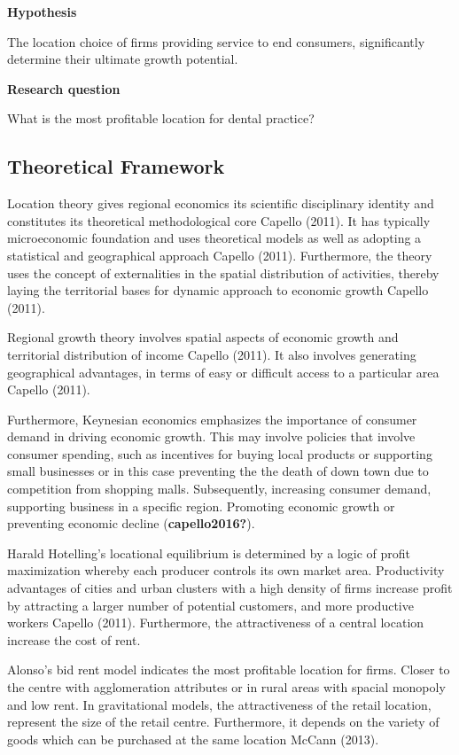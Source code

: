 \documentclass[
  10,
  a4paper,
]{article}
\begin{document}
\textbf{Hypothesis}

The location choice of firms providing service to end consumers,
significantly determine their ultimate growth potential.

\textbf{Research question}

What is the most profitable location for dental practice?

\hypertarget{theoretical-framework}{%
\subsection{Theoretical Framework}\label{theoretical-framework}}

Location theory gives regional economics its scientific disciplinary
identity and constitutes its theoretical methodological core Capello
(2011). It has typically microeconomic foundation and uses theoretical
models as well as adopting a statistical and geographical approach
Capello (2011). Furthermore, the theory uses the concept of
externalities in the spatial distribution of activities, thereby laying
the territorial bases for dynamic approach to economic growth Capello
(2011).

Regional growth theory involves spatial aspects of economic growth and
territorial distribution of income Capello (2011). It also involves
generating geographical advantages, in terms of easy or difficult access
to a particular area Capello (2011).

Furthermore, Keynesian economics emphasizes the importance of consumer
demand in driving economic growth. This may involve policies that
involve consumer spending, such as incentives for buying local products
or supporting small businesses or in this case preventing the the death
of down town due to competition from shopping malls. Subsequently,
increasing consumer demand, supporting business in a specific region.
Promoting economic growth or preventing economic decline
(\textbf{capello2016?}).

Harald Hotelling's locational equilibrium is determined by a logic of
profit maximization whereby each producer controls its own market area.
Productivity advantages of cities and urban clusters with a high density
of firms increase profit by attracting a larger number of potential
customers, and more productive workers Capello (2011). Furthermore, the
attractiveness of a central location increase the cost of rent.

Alonso's bid rent model indicates the most profitable location for
firms. Closer to the centre with agglomeration attributes or in rural
areas with spacial monopoly and low rent. In gravitational models, the
attractiveness of the retail location, represent the size of the retail
centre. Furthermore, it depends on the variety of goods which can be
purchased at the same location McCann (2013).
\end{document}
